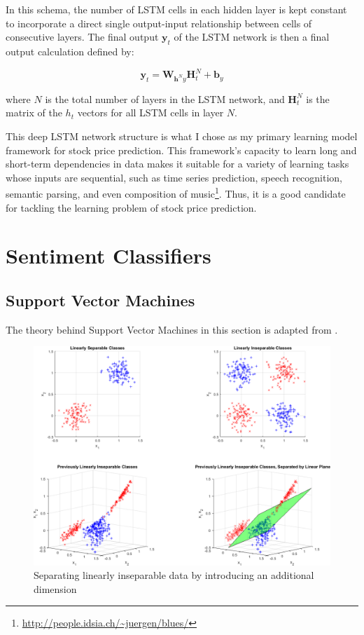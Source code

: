 \documentclass[12pt,a4paper,twoside,openright]{report}
\renewcommand{\vec}[1]{\mathbf{#1}}
\begin{document}
In this schema, the number of LSTM cells in each hidden layer is kept constant
to incorporate a direct single output-input relationship between cells of consecutive layers.
The final output $\vec{y}_t$ of the LSTM network is then a final output calculation defined by:

\begin{equation}
	\vec{y}_t = \vec{W}_{\vec{h}^Ny}\vec{H}_t^N + \vec{b}_y
\end{equation}

where $N$ is the total number of layers in the LSTM network, and $\vec{H}_t^N$ is the matrix
of the $h_t$ vectors for all LSTM cells in layer $N$.

This deep LSTM network structure is what I chose as my primary learning model
framework for stock price prediction. This framework's capacity to learn
long and short-term dependencies in data makes it suitable for a
variety of learning tasks whose inputs are sequential, such as time series prediction,
speech recognition, semantic parsing, and even composition of music\footnote{\url{http://people.idsia.ch/~juergen/blues/}}. 
Thus, it is a good candidate for tackling the learning problem of stock price prediction.

\section{Sentiment Classifiers}

\subsection{Support Vector Machines}
\label{sec:introSVM}

The theory behind Support Vector Machines in this section is adapted from
\cite{Holden18}.

\begin{figure}[H]
	\includegraphics[width=\textwidth]{SVMDataCrop.png}
	\caption[Example of the kernel trick]{Separating linearly inseparable data by introducing an additional dimension\footnotemark}
	\label{fig:SVMSep}
\end{figure}
\end{document}

